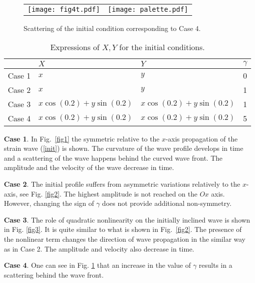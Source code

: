 \begin{figure}
	\begin{center}
		\begin{tabular}{cc}
			\texttt{[image: fig4t.pdf]} & \texttt{[image: palette.pdf]}
		\end{tabular}
		\caption{Scattering of the initial condition corresponding to Case 4.}\label{fig4}
	\end{center}
\end{figure}
\begin{table}[h!]
	\centering
	\begin{tabular}{|l|l|l|l|}
		\hline
		& $X$ & $Y$ & $\gamma$\\ \hline
		Case 1 &  $x$   & $y$  & 0 \\ \hline
		Case 2 &   $x$   &   $y$ & 1 \\ \hline
		Case 3 &  $x \cos (0.2 )+y \sin (0.2 )$   &   $x \cos (0.2 )+y \sin (0.2 )$ & 1\\ \hline
		Case 4 &   $x \cos (0.2 )+y \sin (0.2 )$  &  $x \cos (0.2 )+y \sin (0.2 )$  & 5\\ \hline
	\end{tabular}
	\caption{Expressions of $X, Y$ for the initial conditions.}\label{table1}
\end{table}


\textbf{Case 1}. In Fig.~\ref{fig1} the symmetric relative to the $x$-axis propagation of the strain wave (\ref{init}) is shown. The curvature of the wave profile develops in time and a scattering of the wave happens behind the curved wave front. The amplitude and the velocity of the wave  decrease in  time. 

\textbf{Case 2}. The initial profile suffers from asymmetric variations relatively to the $x$-axis, see Fig. \ref{fig2}. The highest  amplitude is not reached on the $Ox$ axis. However, changing the sign of $\gamma$ does not provide additional non-symmetry.   

\textbf{Case 3}. The role of quadratic nonlinearity on the initially inclined wave is shown in Fig. \ref{fig3}. It is quite similar to what is shown in Fig.~\ref{fig2}. The presence of the nonlinear term changes the direction of wave propagation in the similar way as in Case 2. The amplitude and velocity  also decrease in time.

\textbf{Case 4}. One can see in Fig. \ref{fig4} that an increase in the value of $\gamma$ results in a  scattering behind the wave front.

